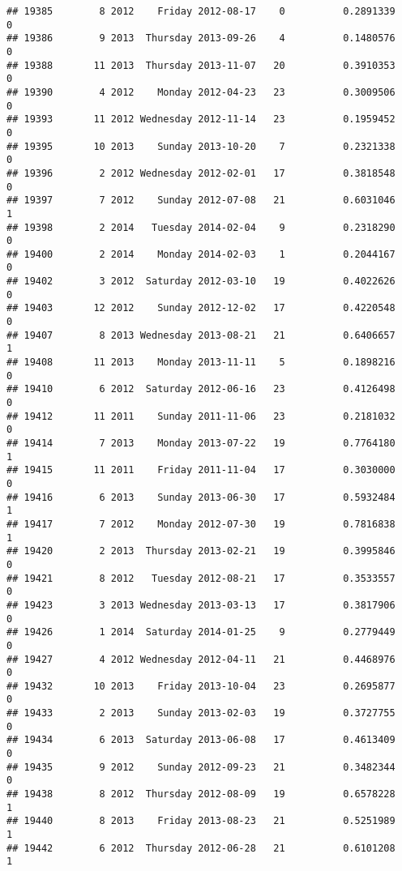 \documentclass[
]{article}
\begin{document}
\begin{verbatim}
## 19385        8 2012    Friday 2012-08-17    0          0.2891339             0
## 19386        9 2013  Thursday 2013-09-26    4          0.1480576             0
## 19388       11 2013  Thursday 2013-11-07   20          0.3910353             0
## 19390        4 2012    Monday 2012-04-23   23          0.3009506             0
## 19393       11 2012 Wednesday 2012-11-14   23          0.1959452             0
## 19395       10 2013    Sunday 2013-10-20    7          0.2321338             0
## 19396        2 2012 Wednesday 2012-02-01   17          0.3818548             0
## 19397        7 2012    Sunday 2012-07-08   21          0.6031046             1
## 19398        2 2014   Tuesday 2014-02-04    9          0.2318290             0
## 19400        2 2014    Monday 2014-02-03    1          0.2044167             0
## 19402        3 2012  Saturday 2012-03-10   19          0.4022626             0
## 19403       12 2012    Sunday 2012-12-02   17          0.4220548             0
## 19407        8 2013 Wednesday 2013-08-21   21          0.6406657             1
## 19408       11 2013    Monday 2013-11-11    5          0.1898216             0
## 19410        6 2012  Saturday 2012-06-16   23          0.4126498             0
## 19412       11 2011    Sunday 2011-11-06   23          0.2181032             0
## 19414        7 2013    Monday 2013-07-22   19          0.7764180             1
## 19415       11 2011    Friday 2011-11-04   17          0.3030000             0
## 19416        6 2013    Sunday 2013-06-30   17          0.5932484             1
## 19417        7 2012    Monday 2012-07-30   19          0.7816838             1
## 19420        2 2013  Thursday 2013-02-21   19          0.3995846             0
## 19421        8 2012   Tuesday 2012-08-21   17          0.3533557             0
## 19423        3 2013 Wednesday 2013-03-13   17          0.3817906             0
## 19426        1 2014  Saturday 2014-01-25    9          0.2779449             0
## 19427        4 2012 Wednesday 2012-04-11   21          0.4468976             0
## 19432       10 2013    Friday 2013-10-04   23          0.2695877             0
## 19433        2 2013    Sunday 2013-02-03   19          0.3727755             0
## 19434        6 2013  Saturday 2013-06-08   17          0.4613409             0
## 19435        9 2012    Sunday 2012-09-23   21          0.3482344             0
## 19438        8 2012  Thursday 2012-08-09   19          0.6578228             1
## 19440        8 2013    Friday 2013-08-23   21          0.5251989             1
## 19442        6 2012  Thursday 2012-06-28   21          0.6101208             1

\end{verbatim}
\end{document}
